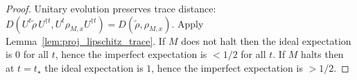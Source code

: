 \begin{proof}
Unitary evolution preserves trace distance:
$D(U^t\widetilde\rho\,U^{\dagger t},U^t\rho_{M,x}U^{\dagger t})=D(\widetilde\rho,\rho_{M,x})$.
Apply Lemma~\ref{lem:proj_lipschitz_trace}.
If $M$ does not halt then the ideal expectation is $0$ for all $t$, hence the imperfect expectation is $<1/2$ for all $t$.
If $M$ halts then at $t=t_\star$ the ideal expectation is $1$, hence the imperfect expectation is $>1/2$.
\end{proof}
